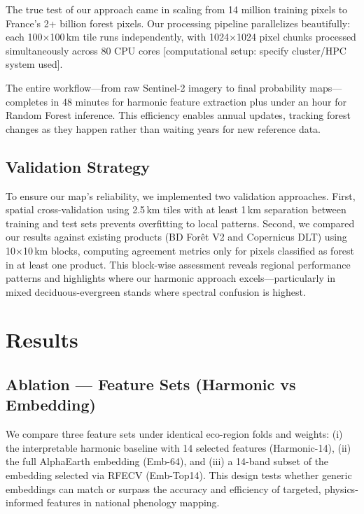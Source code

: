 \documentclass[utf8]{FrontiersinHarvard}
\begin{document}
The true test of our approach came in scaling from 14 million training pixels to France's 2+ billion forest pixels. Our processing pipeline parallelizes beautifully: each 100×100\,km tile runs independently, with 1024×1024 pixel chunks processed simultaneously across 80 CPU cores [computational setup: specify cluster/HPC system used].

The entire workflow—from raw Sentinel-2 imagery to final probability maps—completes in 48 minutes for harmonic feature extraction plus under an hour for Random Forest inference. This efficiency enables annual updates, tracking forest changes as they happen rather than waiting years for new reference data.

\subsection{Validation Strategy}

To ensure our map's reliability, we implemented two validation approaches. First, spatial cross-validation using 2.5\,km tiles with at least 1\,km separation between training and test sets prevents overfitting to local patterns. Second, we compared our results against existing products (BD Forêt V2 and Copernicus DLT) using 10×10\,km blocks, computing agreement metrics only for pixels classified as forest in at least one product. This block-wise assessment reveals regional performance patterns and highlights where our harmonic approach excels—particularly in mixed deciduous-evergreen stands where spectral confusion is highest.

\section{Results}

\subsection{Ablation — Feature Sets (Harmonic vs Embedding)}

We compare three feature sets under identical eco-region folds and weights: (i) the interpretable harmonic baseline with 14 selected features (Harmonic-14), (ii) the full AlphaEarth embedding (Emb-64), and (iii) a 14-band subset of the embedding selected via RFECV (Emb-Top14). This design tests whether generic embeddings can match or surpass the accuracy and efficiency of targeted, physics-informed features in national phenology mapping.
\end{document}
